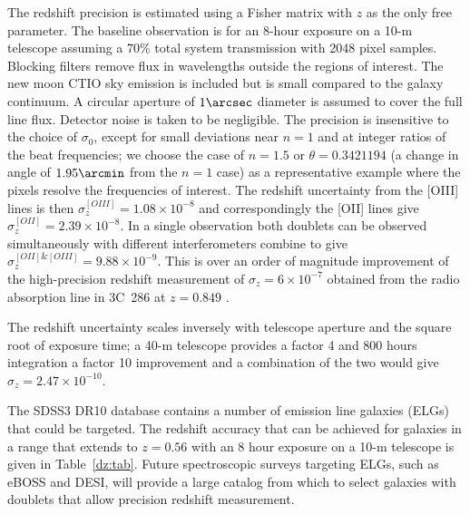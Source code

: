 \documentclass[preprint]{aastex}
\begin{document}
The redshift precision is estimated using a Fisher matrix with $z$ as the only free parameter. 
The baseline observation is for an 8-hour exposure on a 10-m telescope assuming a 70\% total
system transmission
with 2048 pixel samples. 
Blocking filters remove flux in wavelengths outside the regions
of interest.  The new moon CTIO sky emission is included but
is small compared to the galaxy continuum.
A circular aperture of $1\arcsec$ diameter is assumed to cover the full line flux.  Detector noise is taken to be negligible.
The precision is insensitive to the choice of $\sigma_0$, except
for small deviations near $n=1$ and at integer ratios of the beat frequencies; we choose
the case of $n=1.5$ or $\theta = 0.3421194$ (a change in angle of $1.95 \arcmin$ from the $n=1$ case)
as a representative example where the pixels resolve the frequencies of interest.
The redshift uncertainty from the [OIII] lines is then $\sigma_z^{[OIII]}=1.08\times 10^{-8}$
and correspondingly the [OII] lines give $\sigma_z^{[OII]}=2.39\times 10^{-8}$.  In a single observation
both doublets can be observed simultaneously with different interferometers combine to
give $\sigma_z^{[OII]\&[OIII]}=9.88\times 10^{-9}$.
This is over an order of magnitude improvement
of the high-precision redshift measurement of  $\sigma_z=6\times 10^{-7}$ obtained
from the radio absorption line in 3C~286 at $z=0.849$
\citep{1978ApJ...219....1D}.

The redshift uncertainty scales inversely with telescope aperture and the square root of exposure time;
a 40-m telescope provides a factor 4 and 800 hours integration a factor 10 improvement and a combination
of the two would give $\sigma_z=2.47\times 10^{-10}$. 

The SDSS3 DR10 database contains a number of emission line galaxies (ELGs) that could be targeted.
The redshift accuracy that can be achieved for galaxies in a range that extends  to $z=0.56$ with
an 8 hour exposure on a 10-m telescope
is given in Table~\ref{dz:tab}. 
Future spectroscopic surveys targeting ELGs, such as eBOSS and DESI, will provide a large catalog
from which to select galaxies with doublets that allow precision redshift measurement.
\end{document}
